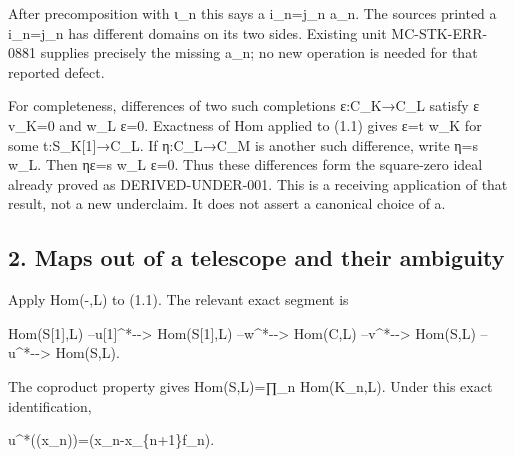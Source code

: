 \documentclass[11pt]{article}
\begin{document}
After precomposition with ι\_\allowbreak{}n this says a i\_\allowbreak{}n\allowbreak{}=j\_\allowbreak{}n a\_\allowbreak{}n. The source\textquotesingle s printed a i\_\allowbreak{}n\allowbreak{}=j\_\allowbreak{}n has different domains on its two sides. Existing unit MC-STK-ERR-0881 supplies precisely the missing a\_\allowbreak{}n; no new operation is needed for that reported defect.

For completeness,\allowbreak{} differences of two such completions ε:\allowbreak{}C\_\allowbreak{}K\allowbreak{}→C\_\allowbreak{}L satisfy ε v\_\allowbreak{}K\allowbreak{}=0 and w\_\allowbreak{}L ε\allowbreak{}=0. Exactness of Hom applied to (1.1)\allowbreak{} gives ε\allowbreak{}=t w\_\allowbreak{}K for some t:\allowbreak{}S\_\allowbreak{}K[1]\allowbreak{}\allowbreak{}→C\_\allowbreak{}L. If η:\allowbreak{}C\_\allowbreak{}L\allowbreak{}→C\_\allowbreak{}M is another such difference,\allowbreak{} write η\allowbreak{}=s w\_\allowbreak{}L. Then ηε\allowbreak{}=s w\_\allowbreak{}L ε\allowbreak{}=0. Thus these differences form the square-zero ideal already proved as DERIVED-UNDER-001. This is a receiving application of that result,\allowbreak{} not a new underclaim. It does not assert a canonical choice of a.

\subsection{2. Maps out of a telescope and their ambiguity}\label{proofs-10139-10427-maps-out-of-a-telescope-and-their-ambiguity}

Apply Hom(-,\allowbreak{}L)\allowbreak{} to (1.1)\allowbreak{}. The relevant exact segment is

Hom(S[1]\allowbreak{},\allowbreak{}L)\allowbreak{} --u[1]\allowbreak{}\textasciicircum{}*-\allowbreak{}-> Hom(S[1]\allowbreak{},\allowbreak{}L)\allowbreak{} --w\textasciicircum{}*-\allowbreak{}-> Hom(C,\allowbreak{}L)\allowbreak{} --v\textasciicircum{}*-\allowbreak{}-> Hom(S,\allowbreak{}L)\allowbreak{} --u\textasciicircum{}*-\allowbreak{}-> Hom(S,\allowbreak{}L)\allowbreak{}.

The coproduct property gives Hom(S,\allowbreak{}L)\allowbreak{}\allowbreak{}=∏\_\allowbreak{}n Hom(K\_\allowbreak{}n,\allowbreak{}L)\allowbreak{}. Under this exact identification,\allowbreak{}

u\textasciicircum{}*((x\_\allowbreak{}n)\allowbreak{})\allowbreak{}\allowbreak{}=(x\_\allowbreak{}n-x\_\allowbreak{}\{n\allowbreak{}+1\}f\_\allowbreak{}n)\allowbreak{}.
\end{document}
